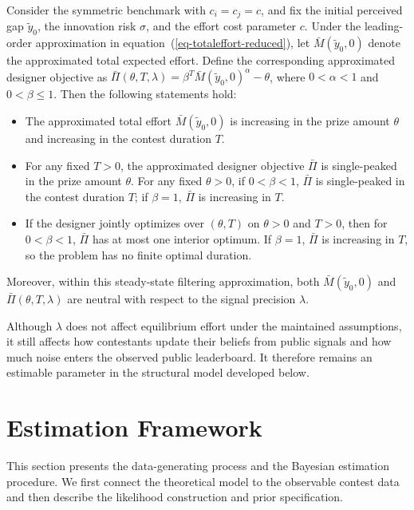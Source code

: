 \documentclass[mnsc]{informs3}
\begin{document}
\begin{proposition}\label{prop-monotonicity-M}
Consider the symmetric benchmark with $c_i=c_j=c$, and fix the initial perceived gap $\tilde y_0$, the innovation risk $\sigma$, and the effort cost parameter $c$.
Under the leading-order approximation in equation~(\ref{eq-totaleffort-reduced}), let $\bar M(\tilde y_0,0)$ denote the approximated total expected effort.
Define the corresponding approximated designer objective as $\bar\Pi(\theta,T,\lambda)=\beta^T \bar M(\tilde y_0,0)^\alpha-\theta$, where $0<\alpha<1$ and $0<\beta\leq 1$.
Then the following statements hold:
\begin{itemize}
	\item [(1)] The approximated total effort $\bar{M}(\tilde y_0,0)$ is increasing in the prize amount $\theta$ and increasing in the contest duration $T$.

	\item [(2)] For any fixed $T>0$, the approximated designer objective $\bar\Pi$ is single-peaked in the prize amount $\theta$. For any fixed $\theta>0$, if $0<\beta<1$, $\bar\Pi$ is single-peaked in the contest duration $T$; if $\beta=1$, $\bar\Pi$ is increasing in $T$.

    \item[(3)] If the designer jointly optimizes over $(\theta,T)$ on $\theta>0$ and $T>0$, then for $0<\beta<1$, $\bar\Pi$ has at most one interior optimum. If $\beta=1$, $\bar\Pi$ is increasing in $T$, so the problem has no finite optimal duration.
\end{itemize}
Moreover, within this steady-state filtering approximation, both $\bar M(\tilde y_0,0)$ and $\bar\Pi(\theta,T,\lambda)$ are neutral with respect to the signal precision $\lambda$.
\end{proposition}

Although \(\lambda\) does not affect equilibrium effort under the maintained assumptions, it still affects how contestants update their beliefs from public signals and how much noise enters the observed public leaderboard. 
It therefore remains an estimable parameter in the structural model developed below.






\section{Estimation Framework}\label{sect-bayes-framework}

This section presents the data-generating process and the Bayesian estimation procedure.
We first connect the theoretical model to the observable contest data and then describe the likelihood construction and prior specification.
\end{document}
